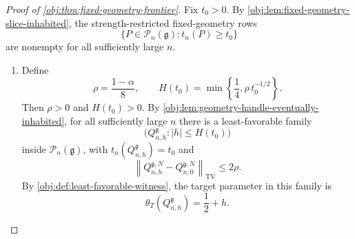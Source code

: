 \begin{proof}[Proof of \cref{obj:thm:fixed-geometry-frontier}]
Fix \(t_0>0\).  By \cref{obj:lem:fixed-geometry-slice-inhabited}, the strength-restricted fixed-geometry rows
\[
\bigl\{P\in\mathcal P_n(\mathfrak g):t_n(P)\ge t_0\bigr\}
\]
are nonempty for all sufficiently large \(n\).

\begin{enumerate}
\item Define
\[
\rho=\frac{1-\alpha}{8},
\qquad
H(t_0)=\min\left\{\frac14,\rho\,t_0^{-1/2}\right\}.
\]
Then \(\rho>0\) and \(H(t_0)>0\).  By \cref{obj:lem:geometry-handle-eventually-inhabited}, for all sufficiently large \(n\) there is a least-favorable family
\[
\bigl(Q_{n,h}^{\mathfrak g}: |h|\le H(t_0)\bigr)
\]
inside \(\mathcal P_n(\mathfrak g)\), with \(t_n(Q_{n,h}^{\mathfrak g})=t_0\) and
\[
\left\|Q_{n,h}^{\mathfrak g,N}-Q_{n,0}^{\mathfrak g,N}\right\|_{\mathrm{TV}}
\le 2\rho .
\]
By \cref{obj:def:least-favorable-witness}, the target parameter in this family is
\[
\theta_T(Q_{n,h}^{\mathfrak g})=\frac12+h .
\]


\end{enumerate}
\end{proof}
